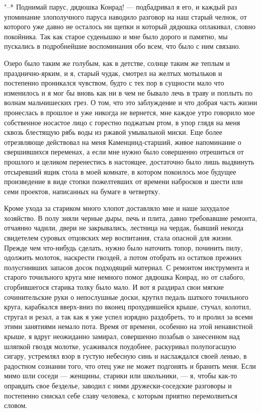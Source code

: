 "--* Поднимай парус,  дядюшка Конрад! --- подбадривал я  его, и каждый
раз  упоминание злополучного  паруса наводило  разговор на  наш старый
челнок, от которого  уже давно не осталось ни щепки  и который дядюшка
оплакивал,  словно покойника.  Так  как старое  суденышко  и мне  было
дорого и памятно,  мы пускались в подробнейшие  воспоминания обо всем,
что было с ним связано.

Озеро было таким  же голубым, как в детстве, солнце  таким же теплым и
празднично-ярким, и  я, старый  чудак, смотрел  на желтых  мотыльков и
постепенно проникался  чувством, будто с  тех пор в сущности  мало что
изменилось и  я мог бы  вновь как ни  в чем не  бывало лечь в  траву и
поплыть по волнам мальчишеских грез. О  том, что это заблуждение и что
добрая часть  жизни пронеслась  в прошлое и  уже никогда  не вернется,
мне  каждое утро  говорило мое  собственное носастое  лицо с  горестно
поджатым ртом,  в упор  глядя на  меня сквозь  блестящую рябь  воды из
ржавой  умывальной миски.  Еще  более отрезвляюще  действовал на  меня
Каменцинд-старший, живое напоминание о  свершившихся переменах, а если
мне нужно было совершенно отрешиться от прошлого и целиком перенестись
в настоящее,  достаточно было лишь  выдвинуть отсыревший ящик  стола в
моей  комнате, в  котором покоилось  мое будущее  произведение в  виде
стопки пожелтевших  от времени  набросков и  шести или  семи проектов,
написанных на бумаге в четвертку.


Кроме ухода за  стариком много хлопот доставляло мне  и наше захудалое
хозяйство. В полу  зияли черные дыры, печь и  плита, давно требовавшие
ремонта, отчаянно  чадили, двери  не закрывались, лестница  на чердак,
бывший  некогда свидетелем  суровых  отцовских  мер воспитания,  стала
опасной для жизни. Прежде чем  что-нибудь сделать, нужно было наточить
топор,  починить пилу,  одолжить молоток,  наскрести гвоздей,  а потом
отобрать  из остатков  прежних полусгнивших  запасов досок  подходящий
материал.  С  ремонтом  инструмента  и старого  точильного  круга  мне
немного  помог дядюшка  Конрад, но  от слабого,  сгорбившегося старика
толку было  мало. И вот я  раздирал свои мягкие сочинительские  руки о
непослушные доски, крутил педаль  шаткого точильного круга, карабкался
вверх-вниз по  вконец прохудившейся крыше, стучал,  колотил, стругал и
резал,  а  так  как  я  уже успел  изрядно  раздобреть,  то  и  пролил
за  всеми этими  занятиями  немало пота.  Время  от времени,  особенно
на  этой ненавистной  крыше,  я вдруг  неожиданно замирал,  совершенно
позабыв о занесенном над шляпкой гвоздя молотке, усаживался поудобнее,
раскуривал полупогасшую сигару, устремлял  взор в густую небесную синь
и наслаждался своей ленью, в радостном  сознании того, что отец уже не
может  подгонять и  бранить меня.  Если мимо  шли соседи  --- женщины,
старики или  школьники, --- я,  чтобы как-то оправдать  свое безделье,
заводил с ними дружески-соседские  разговоры и постепенно снискал себе
славу человека, с которым приятно перемолвиться словом.

